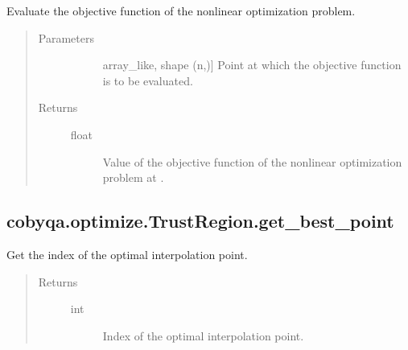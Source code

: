 \documentclass[letterpaper,10pt,english]{sphinxmanual}
\begin{document}
\begin{fulllineitems}
\begin{fulllineitems}
\label{\detokenize{refs/generated/cobyqa.optimize.TrustRegion.fun:cobyqa.optimize.TrustRegion.fun}}
\sphinxAtStartPar
Evaluate the objective function of the nonlinear optimization problem.
\begin{quote}\begin{description}
\item[{Parameters}] \leavevmode\begin{description}
\item[{}] \leavevmode{[}array\_like, shape (n,){]}
\sphinxAtStartPar
Point at which the objective function is to be evaluated.

\end{description}

\item[{Returns}] \leavevmode\begin{description}
\item[{float}] \leavevmode
\sphinxAtStartPar
Value of the objective function of the nonlinear optimization
problem at .

\end{description}

\end{description}\end{quote}

\end{fulllineitems}



\subsection{cobyqa.optimize.TrustRegion.get\_best\_point}
\label{\detokenize{refs/generated/cobyqa.optimize.TrustRegion.get_best_point:cobyqa-optimize-trustregion-get-best-point}}\label{\detokenize{refs/generated/cobyqa.optimize.TrustRegion.get_best_point::doc}}

\begin{fulllineitems}
\label{\detokenize{refs/generated/cobyqa.optimize.TrustRegion.get_best_point:cobyqa.optimize.TrustRegion.get_best_point}}
\sphinxAtStartPar
Get the index of the optimal interpolation point.
\begin{quote}\begin{description}
\item[{Returns}] \leavevmode\begin{description}
\item[{int}] \leavevmode
\sphinxAtStartPar
Index of the optimal interpolation point.


\end{description}
\end{description}
\end{quote}
\end{fulllineitems}
\end{fulllineitems}
\end{document}

